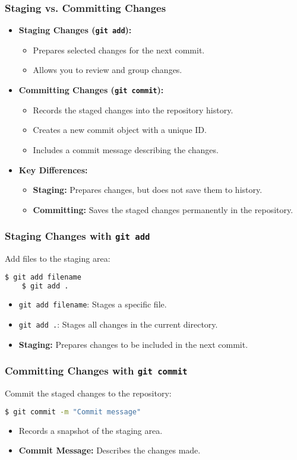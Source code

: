 \begin{frame}
	\frametitle{Staging vs. Committing Changes}
	\begin{itemize}
		\item \textbf{Staging Changes (\texttt{git add}):}
		\begin{itemize}
			\item Prepares selected changes for the next commit.
			\item Allows you to review and group changes.
		\end{itemize}
		\item \textbf{Committing Changes (\texttt{git commit}):}
		\begin{itemize}
			\item Records the staged changes into the repository history.
			\item Creates a new commit object with a unique ID.
			\item Includes a commit message describing the changes.
		\end{itemize}
		\item \textbf{Key Differences:}
		\begin{itemize}
			\item \textbf{Staging:} Prepares changes, but does not save them to history.
			\item \textbf{Committing:} Saves the staged changes permanently in the repository.
		\end{itemize}
	\end{itemize}
\end{frame}

\begin{frame}[fragile]
	\frametitle{Staging Changes with \texttt{git add}}
	Add files to the staging area:
	\begin{lstlisting}[language=bash]
	$ git add filename
	$ git add .
	\end{lstlisting}
	\begin{itemize}
		\item \texttt{git add filename}: Stages a specific file.
		\item \texttt{git add .}: Stages all changes in the current directory.
		\item \textbf{Staging:} Prepares changes to be included in the next commit.
	\end{itemize}
\end{frame}

\begin{frame}[fragile]
	\frametitle{Committing Changes with \texttt{git commit}}
	Commit the staged changes to the repository:
	\begin{lstlisting}[language=bash]
	$ git commit -m "Commit message"
	\end{lstlisting}
	\begin{itemize}
		\item Records a snapshot of the staging area.
		\item \textbf{Commit Message:} Describes the changes made.
	\end{itemize}
\end{frame}


